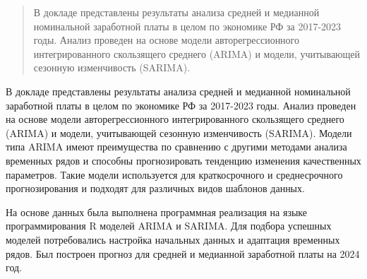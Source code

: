 \begin{abstract}

 

В докладе представлены результаты анализа средней и медианной номинальной заработной платы в целом по экономике РФ за 2017-2023 годы. Анализ проведен на основе модели авторегрессионного интегрированного скользящего среднего  (ARIMA) и модели, учитывающей сезонную изменчивость (SARIMA).

\end{abstract}

В докладе представлены результаты анализа средней и медианной номинальной заработной платы в целом по экономике РФ за 2017-2023 годы. Анализ проведен на основе модели авторегрессионного интегрированного скользящего среднего  (ARIMA) и модели, учитывающей сезонную изменчивость (SARIMA). Модели типа ARIMA имеют преимущества по сравнению с другими методами анализа временных рядов и способны прогнозировать тенденцию изменения качественных параметров. Такие модели используется для краткосрочного и среднесрочного прогнозирования и подходят для различных видов шаблонов данных. 

На основе данных \cite{gg1,gg2} была выполнена  программная реализация на языке программирования R  моделей ARIMA и SARIMA. Для подбора успешных моделей потребовались настройка начальных данных и адаптация временных рядов. Был построен прогноз для средней и медианной
заработной платы на 2024 год.






